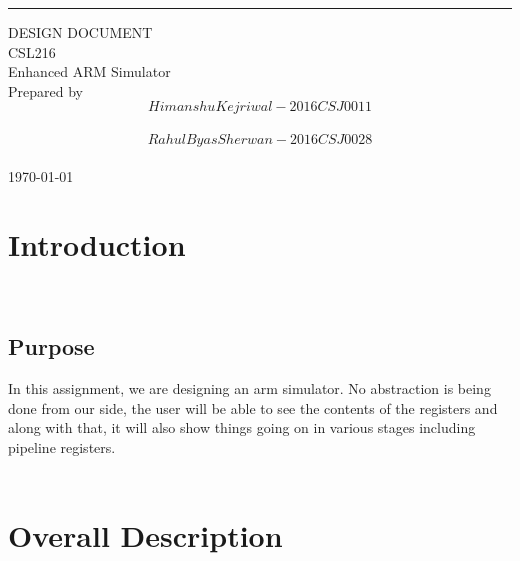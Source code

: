 \documentclass{scrreprt}
\date{}
\begin{document}
\begin{flushright}
    \rule{16cm}{5pt}\vskip1cm
    \begin{bfseries}
        \Huge{DESIGN DOCUMENT}\\
        \vspace{1.9cm}
       CSL216\\
        \vspace{1.9cm}
        \LARGE{Enhanced ARM Simulator}\\
        \vspace{1.9cm}
        Prepared by \\ $$Himanshu Kejriwal - 2016CSJ0011$$\\ $$Rahul Byas Sherwan - 2016CSJ0028$$\\ 
        \vspace{1.9cm}
        \today\\
    \end{bfseries}
\end{flushright}

\tableofcontents

\chapter{Introduction}
$ $
\\
\\
$ $

\section{Purpose}
$ $
\\In this assignment, we are designing an arm simulator. No abstraction is being done from our side, the user will be able to see the contents of the registers and along with that, it will also show things going on in various stages including pipeline registers.\\
\\
$ $

\chapter{Overall Description}
$ $
\\
\\
$ $
\end{document}
